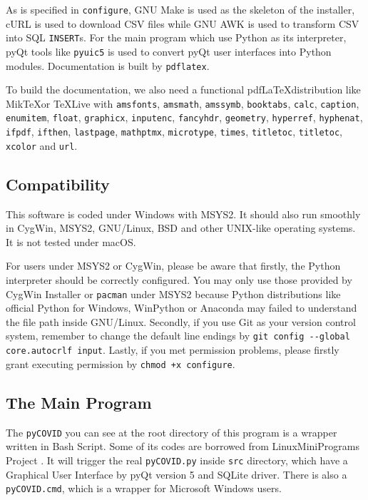 \documentclass[]{ylarticle}
\begin{document}
As is specified in \verb|configure|, GNU Make is used as the skeleton of the installer, cURL is used to download CSV files while GNU AWK is used to transform CSV into SQL \verb|INSERT|s. For the main program which use Python as its interpreter, pyQt tools like \verb|pyuic5| is used to convert pyQt user interfaces into Python modules. Documentation is built by \verb|pdflatex|.

To build the documentation, we also need a functional pdf\LaTeX distribution like Mik\TeX or \TeX Live with \verb|amsfonts|, \verb|amsmath|, \verb|amssymb|, \verb|booktabs|, \verb|calc|, \verb|caption|, \verb|enumitem|, \verb|float|, \verb|graphicx|, \verb|inputenc|, \verb|fancyhdr|, \verb|geometry|, \verb|hyperref|, \verb|hyphenat|, \verb|ifpdf|, \verb|ifthen|, \verb|lastpage|, \verb|mathptmx|, \verb|microtype|, \verb|times|, \verb|titletoc|, \verb|titletoc|, \verb|xcolor| and \verb|url|.

\subsection{Compatibility}
This software is coded under Windows with MSYS2. It should also run smoothly in CygWin, MSYS2, GNU/Linux, BSD and other UNIX-like operating systems. It is not tested under macOS.

For users under MSYS2 or CygWin, please be aware that firstly, the Python interpreter should be correctly configured. You may only use those provided by CygWin Installer or \verb|pacman| under MSYS2 because Python distributions like official Python for Windows, WinPython or Anaconda may failed to understand the file path inside GNU/Linux. Secondly, if you use Git as your version control system, remember to change the default line endings by \verb|git config --global core.autocrlf input|. Lastly, if you met permission problems, please firstly grant executing permission by \verb|chmod +x configure|.

\subsection{The Main Program}

The \verb|pyCOVID| you can see at the root directory of this program is a wrapper written in Bash Script. Some of its codes are borrowed from LinuxMiniPrograms Project \cite{LinuxMiniPrograms}. It will trigger the real \verb|pyCOVID.py| inside \verb|src| directory, which have a Graphical User Interface by pyQt version 5 and SQLite driver. There is also a \verb|pyCOVID.cmd|, which is a wrapper for Microsoft Windows users.
\end{document}
